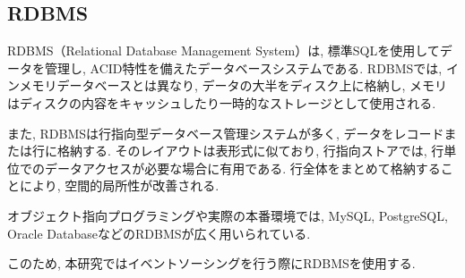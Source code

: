 \documentclass[../../../main]{subfiles}
\begin{document}
    \subsection{RDBMS}\label{subsec:phraseology-rdbms}

    RDBMS（Relational Database Management System）は, 標準SQL\cite{ゼロから始めるデータベース操作}を使用してデータを管理し, ACID特性\cite{詳説データベース}を備えたデータベースシステムである. RDBMSでは, インメモリデータベースとは異なり, データの大半をディスク上に格納し, メモリはディスクの内容をキャッシュしたり一時的なストレージとして使用される.

    また, RDBMSは行指向型データベース管理システムが多く, データをレコードまたは行に格納する. そのレイアウトは表形式に似ており, 行指向ストアでは, 行単位でのデータアクセスが必要な場合に有用である. 行全体をまとめて格納することにより, 空間的局所性が改善される. \cite{詳説データベース}

    オブジェクト指向プログラミング\cite{現場で役立つシステム設計の原則}や実際の本番環境では, MySQL\cite{MySQL}, PostgreSQL\cite{PostgreSQL}, Oracle Database\cite{OracleDB}などのRDBMSが広く用いられている.

    このため, 本研究ではイベントソーシングを行う際にRDBMSを使用する.
\end{document}
